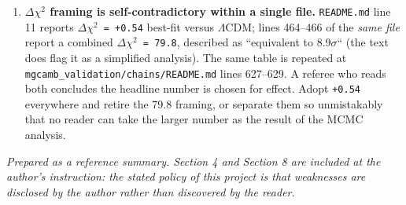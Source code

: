 \documentclass[12pt,a4paper]{article}
\begin{document}
\begin{enumerate}
  \item \textbf{\texttt{$\Delta\chi^{2}$} framing is self-contradictory within a single file.} \texttt{README.md} line 11 reports \texttt{$\Delta\chi^{2}$ = +0.54} best-fit versus $\Lambda$CDM; lines 464--466 of the \textit{same file} report a combined \texttt{$\Delta\chi^{2}$ = 79.8}, described as ``equivalent to 8.9$\sigma$`` (the text does flag it as a simplified analysis). The same table is repeated at \texttt{mgcamb\_validation/chains/README.md} lines 627--629. A referee who reads both concludes the headline number is chosen for effect. Adopt \texttt{+0.54} everywhere and retire the 79.8 framing, or separate them so unmistakably that no reader can take the larger number as the result of the MCMC analysis.
\end{enumerate}




\textit{Prepared as a reference summary. Section 4 and Section 8 are included at the author's instruction: the stated policy of this project is that weaknesses are disclosed by the author rather than discovered by the reader.}
\end{document}
